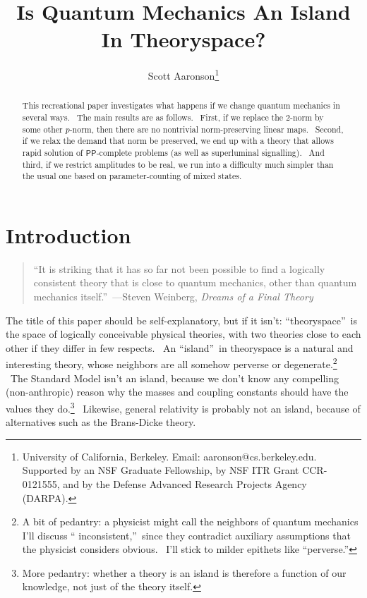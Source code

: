 \documentclass{article}%
\begin{document}
\title{Is Quantum Mechanics An Island In Theoryspace?}
\author{Scott Aaronson\thanks{University of California, Berkeley. Email:
aaronson@cs.berkeley.edu. Supported by an NSF Graduate Fellowship, by NSF ITR
Grant CCR-0121555, and by the Defense Advanced Research Projects Agency (DARPA).}}
\date{}
\maketitle

\begin{abstract}
This recreational paper investigates what happens if we change quantum
mechanics in several ways. \ The main results are as follows. \ First, if we
replace the $2$-norm by some other $p$-norm, then there are no nontrivial
norm-preserving linear maps. \ Second, if we relax the demand that norm be
preserved, we end up with a theory that allows rapid solution of $\mathsf{PP}%
$-complete problems (as well as superluminal signalling). \ And third, if we
restrict amplitudes to be real, we run into a difficulty much simpler than the
usual one based on parameter-counting of mixed states.

\end{abstract}

\section{Introduction\label{INTRO}}

\begin{quote}
``It is striking that it has so far not been possible to find a logically
consistent theory that is close to quantum mechanics, other than quantum
mechanics itself.''\ ---Steven Weinberg, \textit{Dreams of a Final Theory} \cite{weinberg2}
\end{quote}

The title of this paper should be self-explanatory, but if it isn't:
\textquotedblleft theoryspace\textquotedblright\ is the space of logically
conceivable physical theories, with two theories close to each other if they
differ in few respects. \ An \textquotedblleft island\textquotedblright\ in
theoryspace is a natural and interesting theory, whose neighbors are all
somehow perverse or degenerate.\footnote{A bit of pedantry: a physicist might
call the neighbors of quantum mechanics I'll discuss \textquotedblleft
inconsistent,\textquotedblright\ since they contradict auxiliary assumptions
that the physicist considers obvious. \ I'll stick to milder epithets like
\textquotedblleft perverse.\textquotedblright} \ The Standard Model isn't an
island, because we don't know any compelling (non-anthropic) reason why the
masses and coupling constants should have the values they do.\footnote{More
pedantry: whether a theory is an island is therefore a function of our
knowledge, not just of the theory itself.} \ Likewise, general relativity is
probably not an island, because of alternatives such as the Brans-Dicke theory.
\end{document}
